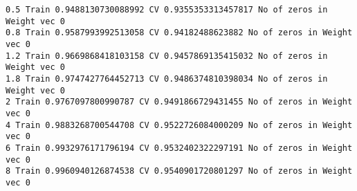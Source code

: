 \documentclass[11pt]{article}
\begin{document}
    \begin{Verbatim}[commandchars=\\\{\}]
0.5 Train 0.9488130730088992 CV 0.9355353313457817 No of zeros in Weight vec 0
0.8 Train 0.9587993992513058 CV 0.94182488623882 No of zeros in Weight vec 0
1.2 Train 0.9669868418103158 CV 0.9457869135415032 No of zeros in Weight vec 0
1.8 Train 0.9747427764452713 CV 0.9486374810398034 No of zeros in Weight vec 0
2 Train 0.9767097800990787 CV 0.9491866729431455 No of zeros in Weight vec 0
4 Train 0.9883268700544708 CV 0.9522726084000209 No of zeros in Weight vec 0
6 Train 0.9932976171796194 CV 0.9532402322297191 No of zeros in Weight vec 0
8 Train 0.9960940126874538 CV 0.9540901720801297 No of zeros in Weight vec 0

    \end{Verbatim}
\end{document}
